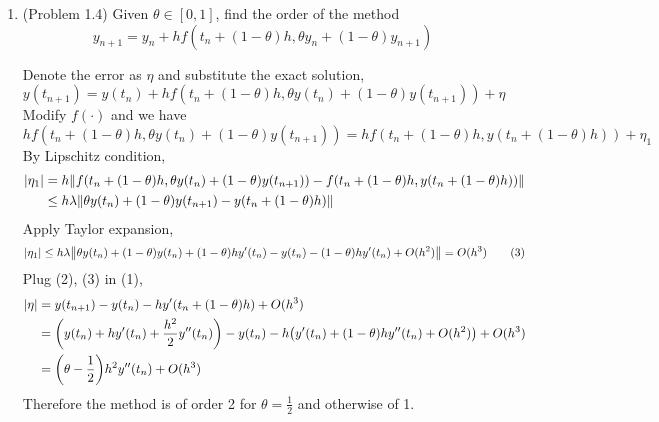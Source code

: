 \documentclass[10pt]{report}
\newcommand{\abs}[1] {\left| #1 \right|}
\DeclarePairedDelimiter\autoparen{(}{)}
\newcommand{\pa}[1]{\autoparen*{#1}}
\DeclarePairedDelimiter\autodvert{\Vert}{\Vert}
\newcommand{\norm}[1]{\autodvert*{#1}}
\begin{document}
\begin{enumerate}
	\item 
	(Problem 1.4) Given $\theta\in[0,1]$, find the order of the method
	\[
	y_{n+1} = y_n + hf(t_n+(1-\theta)h, \theta y_n + (1-\theta)y_{n+1})
	\]
	
	Denote the error as $\eta$ and substitute the exact solution,
	\[
	y(t_{n+1}) = y(t_n) + hf(t_n+(1-\theta)h, \theta y(t_n) + (1-\theta)y(t_{n+1})) + \eta	\tag{1}
	\]
	Modify $f(\cdot)$ and we have
	\[
	hf(t_n+(1-\theta)h, \theta y(t_n) + (1-\theta)y(t_{n+1}))
	= hf(t_n+(1-\theta)h, y(t_n+(1-\theta)h)) + \eta_1	\tag{2}
	\]
	By Lipschitz condition,
	\begin{align*}
	\abs{\eta_1} 
	&= h\norm{f(t_n+(1-\theta)h, \theta y(t_n) + (1-\theta)y(t_{n+1})) - f(t_n+(1-\theta)h, y(t_n+(1-\theta)h))}\\
	&\le h\lambda \norm{\theta y(t_n) + (1-\theta)y(t_{n+1}) - y(t_n+(1-\theta)h)}
	\end{align*}
	Apply Taylor expansion,
	\[
	\abs{\eta_1} 
	\le h\lambda \norm{\theta y(t_n) + (1-\theta)y(t_n) + (1-\theta)hy'(t_n) - y(t_n) - (1-\theta)hy'(t_n) + O(h^2)}
	= O(h^3)	\tag{3}
	\]
	Plug (2), (3) in (1),
	\begin{align*}
	\abs{\eta}
	&= y(t_{n+1}) - y(t_n) - hy'(t_n + (1-\theta)h) + O(h^3)\\
	&= \pa{y(t_n) + hy'(t_n) + \frac{h^2}{2}y''(t_n)} - y(t_n) - h\pa{y'(t_n) + (1-\theta)hy''(t_n) + O(h^2)} + O(h^3)\\
	&= \pa{\theta-\frac{1}{2}}h^2y''(t_n) + O(h^3)
	\end{align*}
	Therefore the method is of order 2 for $\theta = \frac{1}{2}$ and otherwise of 1.
	
\end{enumerate}
\end{document}
